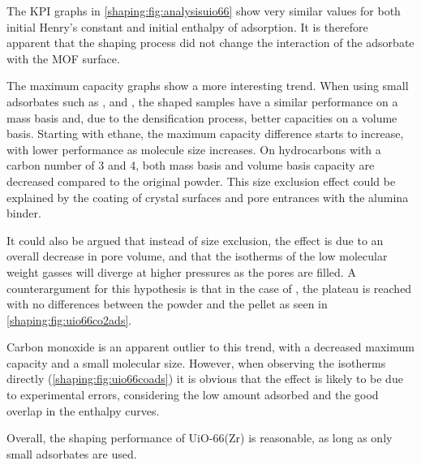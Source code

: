 The \gls{KPI} graphs in \autoref{shaping:fig:analysisuio66} show very
similar values for both initial Henry's constant and initial
enthalpy of adsorption. It is therefore apparent that the shaping process
did not change the interaction of the adsorbate with the \gls{MOF} surface.

The maximum capacity graphs show a more interesting trend.
When using small adsorbates such as ,  and ,
the shaped samples have a similar performance on a mass basis and,
due to the densification process, better capacities on a volume
basis. Starting with ethane, the maximum capacity difference starts
to increase, with lower performance as molecule size increases.
On hydrocarbons with a carbon number of 3 and 4, both mass basis and
volume basis capacity are decreased compared to the original powder.
This size exclusion effect could be explained by the coating of
crystal surfaces and pore entrances with the alumina binder.

It could also be argued that instead of size exclusion, the effect is due to
an overall decrease in pore volume, and that the isotherms of the
low molecular weight gasses will diverge at higher pressures
as the pores are filled. A counterargument for this hypothesis is that
in the case of , the plateau is reached with no differences
between the powder and the pellet as seen
in \autoref{shaping:fig:uio66co2ads}.

Carbon monoxide is an apparent outlier to this trend, with a
decreased maximum capacity and a small molecular size.
However, when observing the isotherms directly
(\autoref{shaping:fig:uio66coads}) it is obvious that the effect is
likely to be due to experimental errors, considering
the low amount adsorbed and the good overlap in the enthalpy
curves.

Overall, the shaping performance of UiO-66(Zr) is
reasonable, as long as only small adsorbates are used.
